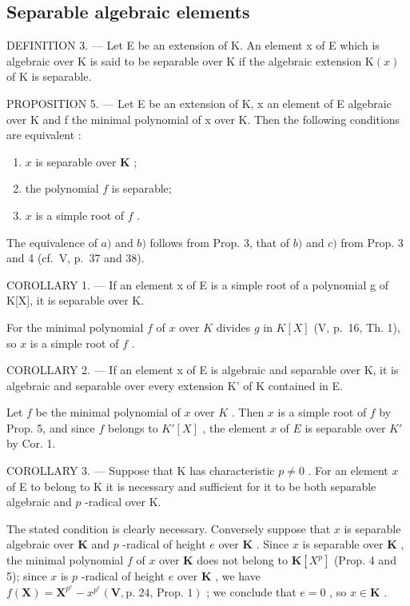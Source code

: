 \subsection{Separable algebraic elements}

DEFINITION 3. --- Let E be an extension of K. An element x of E which is algebraic over K is said to be separable over K if the algebraic extension \(\mathrm{K}(x)\) of K is separable.

PROPOSITION 5. --- Let E be an extension of K, x an element of E algebraic over K and f the minimal polynomial of x over K. Then the following conditions are equivalent :

\begin{enumerate}
\def\labelenumi{\alph{enumi})}
\item
  \(x\) is separable over \(\mathbf{K}\) ;
\item
  the polynomial \(f\) is separable;
\item
  \(x\) is a simple root of \(f\) .
\end{enumerate}

The equivalence of \(a)\) and \(b)\) follows from Prop. 3, that of \(b)\) and \(c)\) from Prop. 3 and 4 (cf.~V, p.~37 and 38).

COROLLARY 1. --- If an element x of E is a simple root of a polynomial g of K{[}X{]}, it is separable over K.

For the minimal polynomial \(f\) of \(x\) over \(K\) divides \(g\) in \(K[X]\) (V, p.~16, Th. 1), so \(x\) is a simple root of \(f\) .

COROLLARY 2. --- If an element x of E is algebraic and separable over K, it is algebraic and separable over every extension K' of K contained in E.

Let \(f\) be the minimal polynomial of \(x\) over \(K\) . Then \(x\) is a simple root of \(f\) by Prop. 5, and since \(f\) belongs to \(K'[X]\) , the element \(x\) of \(E\) is separable over \(K'\) by Cor. 1.

COROLLARY 3. --- Suppose that K has characteristic \(p \neq 0\) . For an element \(x\) of E to belong to K it is necessary and sufficient for it to be both separable algebraic and \(p\) -radical over K.

The stated condition is clearly necessary. Conversely suppose that \(x\) is separable algebraic over \(\mathbf{K}\) and \(p\) -radical of height \(e\) over \(\mathbf{K}\) . Since \(x\) is separable over \(\mathbf{K}\) , the minimal polynomial \(f\) of \(x\) over \(\mathbf{K}\) does not belong to \(\mathbf{K}[X^p]\) (Prop. 4 and 5); since \(x\) is \(p\) -radical of height \(e\) over \(\mathbf{K}\) , we have \(f(\mathbf{X}) = \mathbf{X}^{p^e} - x^{p^e}(\mathbf{V},\text{p. 24, Prop. 1})\) ; we conclude that \(e = 0\) , so \(x \in \mathbf{K}\) .

